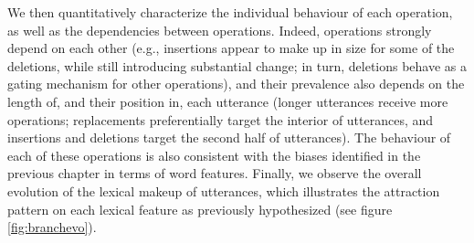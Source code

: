 \documentclass[english,]{article}
\begin{document}
We then quantitatively characterize the individual behaviour of each operation, as well as the dependencies between operations.
Indeed, operations strongly depend on each other (e.g., insertions appear to make up in size for some of the deletions, while still introducing substantial change; in turn, deletions behave as a gating mechanism for other operations), and their prevalence also depends on the length of, and their position in, each utterance (longer utterances receive more operations; replacements preferentially target the interior of utterances, and insertions and deletions target the second half of utterances).
The behaviour of each of these operations is also consistent with the biases identified in the previous chapter in terms of word features.%
Finally, we observe the overall evolution of the lexical makeup of utterances, which illustrates the attraction pattern on each lexical feature as previously hypothesized (see figure \ref{fig:branchevo}).
\end{document}
